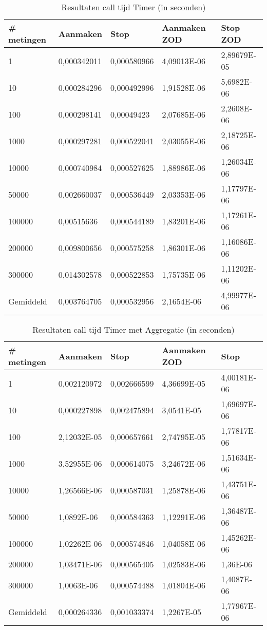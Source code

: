 \begin{table}[]
\centering
\begin{tabular}{|l|l|l|l|l|}
\hline
\# metingen   & Aanmaken    & Stop        & Aanmaken ZOD & Stop ZOD    \\ \hline
1         & 0,000342011 & 0,000580966 & 4,09013E-06  & 2,89679E-05 \\ \hline
10        & 0,000284296 & 0,000492996 & 1,91528E-06  & 5,6982E-06  \\ \hline
100       & 0,000298141 & 0,00049423  & 2,07685E-06  & 2,2608E-06  \\ \hline
1000      & 0,000297281 & 0,000522041 & 2,03055E-06  & 2,18725E-06 \\ \hline
10000     & 0,000740984 & 0,000527625 & 1,88986E-06  & 1,26034E-06 \\ \hline
50000     & 0,002660037 & 0,000536449 & 2,03353E-06  & 1,17797E-06 \\ \hline
100000    & 0,00515636  & 0,000544189 & 1,83201E-06  & 1,17261E-06 \\ \hline
200000    & 0,009800656 & 0,000575258 & 1,86301E-06  & 1,16086E-06 \\ \hline
300000    & 0,014302578 & 0,000522853 & 1,75735E-06  & 1,11202E-06 \\ \hline
Gemiddeld & 0,003764705 & 0,000532956 & 2,1654E-06   & 4,99977E-06 \\ \hline
\end{tabular}
\caption{Resultaten call tijd Timer (in seconden)}
\label{Table:Timer}
\end{table}

\begin{table}[]
\centering
\begin{tabular}{|l|l|l|l|l|}
\hline
\# metingen & Aanmaken    & Stop        & Aanmaken ZOD & Stop        \\ \hline
1           & 0,002120972 & 0,002666599 & 4,36699E-05  & 4,00181E-06 \\ \hline
10          & 0,000227898 & 0,002475894 & 3,0541E-05   & 1,69697E-06 \\ \hline
100         & 2,12032E-05 & 0,000657661 & 2,74795E-05  & 1,77817E-06 \\ \hline
1000        & 3,52955E-06 & 0,000614075 & 3,24672E-06  & 1,51634E-06 \\ \hline
10000       & 1,26566E-06 & 0,000587031 & 1,25878E-06  & 1,43751E-06 \\ \hline
50000       & 1,0892E-06  & 0,000584363 & 1,12291E-06  & 1,36487E-06 \\ \hline
100000      & 1,02262E-06 & 0,000574846 & 1,04058E-06  & 1,45262E-06 \\ \hline
200000      & 1,03471E-06 & 0,000565405 & 1,02583E-06  & 1,36E-06    \\ \hline
300000      & 1,0063E-06  & 0,000574488 & 1,01804E-06  & 1,4087E-06  \\ \hline
Gemiddeld   & 0,000264336 & 0,001033374 & 1,2267E-05   & 1,77967E-06 \\ \hline
\end{tabular}
\caption{Resultaten call tijd Timer met Aggregatie (in seconden)}
\label{Table:TimerAggregate}
\end{table}

